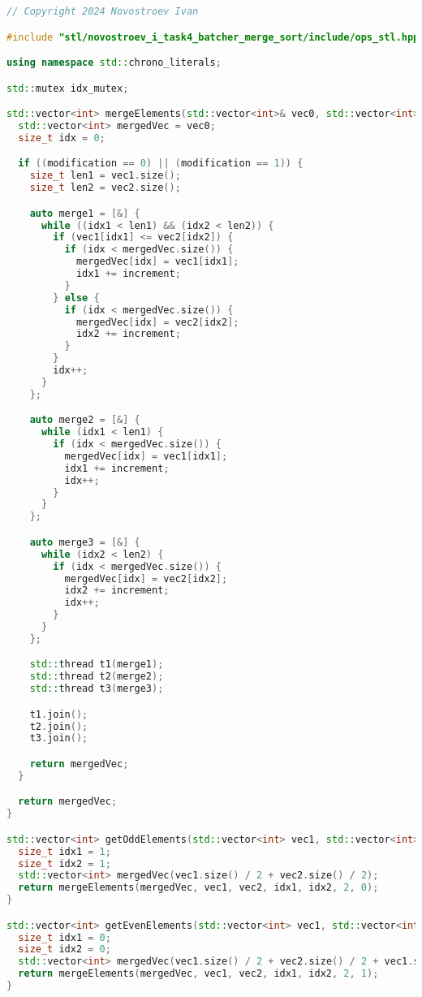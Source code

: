 \documentclass{report}
\begin{document}
\newpage

\begin{lstlisting}[language=C++,caption=STL версия]
// Copyright 2024 Novostroev Ivan

#include "stl/novostroev_i_task4_batcher_merge_sort/include/ops_stl.hpp"

using namespace std::chrono_literals;

std::mutex idx_mutex;

std::vector<int> mergeElements(std::vector<int>& vec0, std::vector<int>& vec1, std::vector<int>& vec2, size_t idx1, size_t idx2, size_t increment, int modification) {
  std::vector<int> mergedVec = vec0;
  size_t idx = 0;

  if ((modification == 0) || (modification == 1)) {
    size_t len1 = vec1.size();
    size_t len2 = vec2.size();

    auto merge1 = [&] {
      while ((idx1 < len1) && (idx2 < len2)) {
        if (vec1[idx1] <= vec2[idx2]) {
          if (idx < mergedVec.size()) {
            mergedVec[idx] = vec1[idx1];
            idx1 += increment;
          }
        } else {
          if (idx < mergedVec.size()) {
            mergedVec[idx] = vec2[idx2];
            idx2 += increment;
          }
        }
        idx++;
      }
    };

    auto merge2 = [&] {
      while (idx1 < len1) {
        if (idx < mergedVec.size()) {
          mergedVec[idx] = vec1[idx1];
          idx1 += increment;
          idx++;
        }
      }
    };

    auto merge3 = [&] {
      while (idx2 < len2) {
        if (idx < mergedVec.size()) {
          mergedVec[idx] = vec2[idx2];
          idx2 += increment;
          idx++;
        }
      }
    };

    std::thread t1(merge1);
    std::thread t2(merge2);
    std::thread t3(merge3);

    t1.join();
    t2.join();
    t3.join();

    return mergedVec;
  }

  return mergedVec;
}

std::vector<int> getOddElements(std::vector<int> vec1, std::vector<int> vec2) {
  size_t idx1 = 1;
  size_t idx2 = 1;
  std::vector<int> mergedVec(vec1.size() / 2 + vec2.size() / 2);
  return mergeElements(mergedVec, vec1, vec2, idx1, idx2, 2, 0);
}

std::vector<int> getEvenElements(std::vector<int> vec1, std::vector<int> vec2) {
  size_t idx1 = 0;
  size_t idx2 = 0;
  std::vector<int> mergedVec(vec1.size() / 2 + vec2.size() / 2 + vec1.size() % 2 + vec2.size() % 2);
  return mergeElements(mergedVec, vec1, vec2, idx1, idx2, 2, 1);
}


\end{lstlisting}
\end{document}

